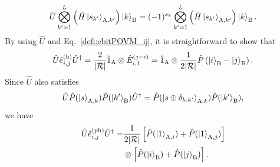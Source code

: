 \documentclass[twocolumn,superscriptaddress,pra,footinbib,notitlepage]{revtex4-1}
\newcommand{\1}{\mbox{1}\hspace{-0.25em}\mbox{l}}
\newcommand{\abs}[1]{\lvert#1\rvert}
\begin{document}
\begin{align}
\hat{U}\bigotimes_{k'=1}^L\left(\hat{H}\ket{s_{k'}}_{\textrm{A}, k'}\right)\ket{k}_\textrm{B}=(-1)^{s_k}\bigotimes_{k'=1}^L\left(\hat{H}\ket{s_{k'}}_{\textrm{A}, k'}\right)\ket{k}_\textrm{B}.\label{defi:unitary}
\end{align}
By using $\hat{U}$ and Eq.~\eqref{defi:ebitPOVM_ij}, it is straightforward to show that
\begin{align}
\hat{U}\hat{e}^{(\textrm{b})}_{i, j}\hat{U}^\dagger=\frac{2}{\abs{\mathcal{R}}}\hat{1}_\textrm{A}\otimes\hat{E}_{i, 1}^{(j-i)}=\hat{1}_\textrm{A}\otimes\frac{1}{2\abs{\mathcal{R}}}\hat{P}\left(\ket{i}_\textrm{B}-\ket{j}_\textrm{B}\right).\label{eq:unitary-ebit_ij}
\end{align}
Since $\hat{U}$ also satisfies
\begin{align}
\hat{U}\hat{P}(\ket{s}_{\textrm{A}, k})\hat{P}(\ket{k'}_\textrm{B})\hat{U}^\dagger=\hat{P}(\ket{s\oplus\delta_{k, k'}}_{\textrm{A}, k})\hat{P}(\ket{k'}_\textrm{B}),
\end{align}
we have
\begin{align}
\hat{U}\hat{e}_{i, j}^{(\textrm{ph})}\hat{U}^\dagger=&\frac{1}{2\abs{\mathcal{R}}}\left[\hat{P}(\ket{1}_{\textrm{A}, i})+\hat{P}(\ket{1}_{\textrm{A}, j})\right]\nonumber\\
&\otimes\left[\hat{P}(\ket{i}_\textrm{B})+\hat{P}(\ket{j}_\textrm{B})\right].\label{eq:unitary-eph_ij}
\end{align}
\end{document}
